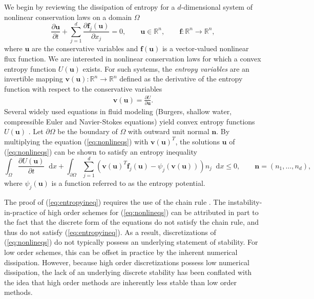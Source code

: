\documentclass[review]{siamart0216}
\theoremstyle{assumption}
\newcommand{\pd}[2]{\frac{\partial#1}{\partial#2}}
\newcommand{\LRp}[1]{\left( #1 \right)}
\newcommand*\diff[1]{\mathop{}\!{\mathrm{d}#1}}
\begin{document}
We begin by reviewing the dissipation of entropy for a $d$-dimensional system of nonlinear conservation laws on a domain $\Omega$
\begin{equation}
\pd{\bm{u}}{t}  + \sum_{j=1}^d\pd{\bm{f}_j(\bm{u})}{x_j} = 0, \qquad \bm{u}\in \mathbb{R}^n, \qquad \bm{f}:\mathbb{R}^n\rightarrow\mathbb{R}^n,
\label{eq:nonlineqs}
\end{equation}
where $\bm{u}$ are the conservative variables and $\bm{f}(\bm{u})$ is a vector-valued nonlinear flux function.  We are interested in nonlinear conservation laws for which a convex entropy function $U(\bm{u})$ exists.  For such systems, the  \emph{entropy variables} are an invertible mapping $\bm{v}(\bm{u}):\mathbb{R}^n\rightarrow \mathbb{R}^n$ defined as the derivative of the entropy function with respect to the conservative variables 
\begin{align}
\bm{v}(\bm{u}) = \pd{U}{\bm{u}}.%
\label{eq:entropyvarsmap}
\end{align}
Several widely used equations in fluid modeling (Burgers, shallow water, compressible Euler and Navier-Stokes equations) yield convex entropy functions $U(\bm{u})$ \cite{hughes1986new, chen2017entropy}.  Let $\partial \Omega$ be the boundary of $\Omega$ with outward unit normal $\bm{n}$.  By multiplying the equation (\ref{eq:nonlineqs}) with $\bm{v}(\bm{u})^T$, the solutions $\bm{u}$ of (\ref{eq:nonlineqs}) can be shown to satisfy an entropy inequality
\begin{equation}
\int_{\Omega}\pd{U(\bm{u})}{t}\diff{x} + \int_{\partial \Omega} \sum_{j=1}^d \LRp{\bm{v}(\bm{u})^T\bm{f}_j(\bm{u}) - \psi_j\LRp{\bm{v}(\bm{u})}}n_j \diff{x} \leq 0, \qquad \bm{n} = \LRp{n_1,\ldots,n_d}, 
\label{eq:entropyineq}
\end{equation}
where $\psi_j(\bm{u})$ is a function referred to as the entropy potential.  

The proof of (\ref{eq:entropyineq}) requires the use of the chain rule \cite{mock1980systems, harten1983symmetric, dafermos2005compensated}.  The instability-in-practice of high order schemes for (\ref{eq:nonlineqs}) can be attributed in part to the fact that the discrete form of the equations do not satisfy the chain rule, and thus do not satisfy (\ref{eq:entropyineq}).  As a result, discretizations of (\ref{eq:nonlineqs}) do not typically possess an underlying statement of stability.  For low order schemes, this can be offset in practice by the inherent numerical dissipation.  However, because high order discretizations possess low numerical dissipation, the lack of an underlying discrete stability has been conflated with the idea that high order methods are inherently less stable than low order methods.
\end{document}
